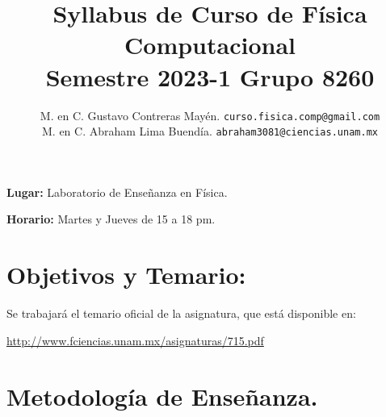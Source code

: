

\author{M. en C. Gustavo Contreras Mayén. \texttt{curso.fisica.comp@gmail.com}\\
M. en C. Abraham Lima Buendía. \texttt{abraham3081@ciencias.unam.mx}}
\title{Syllabus de Curso de Física Computacional \\ {\large Semestre 2023-1 Grupo 8260}}
\date{ }

\usepackage[backend=biber, style=ieee, sorting=ynt]{biblatex}





\renewcommand\labelenumii{\theenumi.{\arabic{enumii}}}
\maketitle
\fontsize{12}{12}\selectfont

\textbf{Lugar: } Laboratorio de Enseñanza en Física.
\par
\textbf{Horario: } Martes y Jueves de 15 a 18 pm.
\par
\par
\section{Objetivos y Temario:}

Se trabajará el temario oficial de la asignatura, que está disponible en:

\href{http://www.fciencias.unam.mx/asignaturas/715.pdf}{http://www.fciencias.unam.mx/asignaturas/715.pdf}

\section{Metodología de Enseñanza.}

